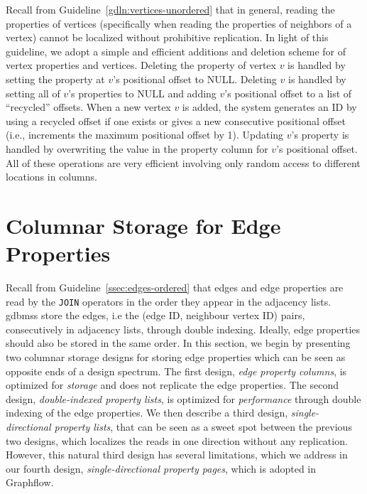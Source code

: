 
Recall from Guideline~\ref{gdln:vertices-unordered} that in general, reading the properties of vertices (specifically when reading the properties of neighbors of a vertex) cannot be localized without prohibitive replication. In light of this guideline, we adopt a simple and efficient additions and deletion scheme for of vertex properties and vertices. Deleting  the property of vertex $v$ is handled by setting the property at $v$'s positional offset to NULL.  Deleting $v$ is handled by setting all of $v$'s properties to NULL and adding $v$'s positional offset to a list of ``recycled'' offsets. When a new vertex $v$ is added, the system generates an ID by using a recycled offset if one exists or gives a new consecutive positional offset (i.e., increments the maximum positional offset by 1). Updating $v$'s property is handled by overwriting the value in the property column for $v$'s positional offset. All of these operations are very efficient involving only random access to different locations in columns.

\section{Columnar Storage for Edge Properties}
\label{sec:edge-property-columns}

Recall from Guideline~\ref{ssec:edges-ordered} that edges and edge properties  are read by the \texttt{JOIN} operators in the order they appear in the adjacency lists. \gls{gdbms}s store the edges, i.e the (edge ID, neighbour  vertex ID) pairs, consecutively in adjacency lists, through double indexing. Ideally, edge properties should also be stored in the same order. In this section, we begin by presenting two columnar storage designs for storing edge properties which can be seen as opposite ends of a design spectrum. The first design, {\em edge property columns}, is optimized for \emph{storage} and does not replicate the edge properties. The second design, {\em double-indexed property lists}, is optimized for \emph{performance} through double indexing of the edge properties. We then describe a third design, {\em single-directional property lists}, that can be seen as a sweet spot between the previous two designs, which localizes the reads in one direction without any replication. However, this natural third design has several limitations, which we address in our fourth design, {\em single-directional property pages}, which is adopted in Graphflow. 


